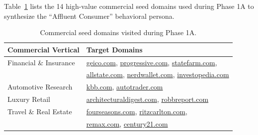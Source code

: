 Table~\ref{tab:seeders} lists the 14 high-value commercial seed domains used during Phase 1A to synthesize the ``Affluent Consumer'' behavioral persona.

\begin{table}[h]
\centering
\small
\caption{Commercial seed domains visited during Phase 1A.}
\label{tab:seeders}
\begin{tabular}{ll}
\toprule
\textbf{Commercial Vertical} & \textbf{Target Domains} \\
\midrule
Financial \& Insurance & \url{geico.com}, \url{progressive.com}, \url{statefarm.com}, \\
                       & \url{allstate.com}, \url{nerdwallet.com}, \url{investopedia.com} \\
Automotive Research    & \url{kbb.com}, \url{autotrader.com} \\
Luxury Retail          & \url{architecturaldigest.com}, \url{robbreport.com} \\
Travel \& Real Estate  & \url{fourseasons.com}, \url{ritzcarlton.com}, \\
                       & \url{remax.com}, \url{century21.com} \\
\bottomrule
\end{tabular}
\end{table}





 

